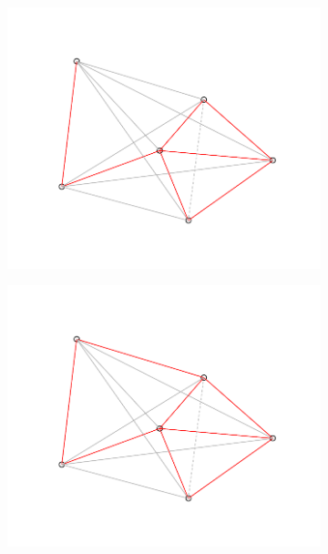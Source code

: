 \begin{figure}[h]
\begin{subfigure}{0.25\textwidth}
  \includegraphics[width=\linewidth]{./pictures/4/triangulation_9.pdf}
  \label{fig:3-triangulation_9}
\end{subfigure}\hfil %
\begin{subfigure}{0.25\textwidth}
  \includegraphics[width=\linewidth]{./pictures/4/triangulation_10.pdf}
  \label{fig:3-triangulation_10}
\end{subfigure}\hfil %
\begin{subfigure}{0.25\textwidth}

\end{subfigure}
\end{figure}
